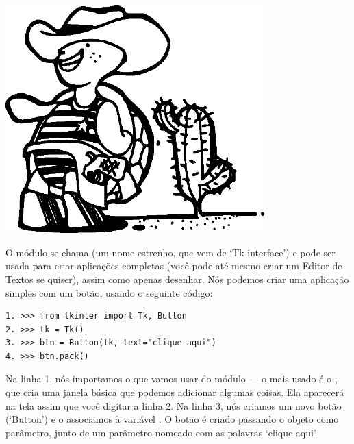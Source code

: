 \begin{center}
\includegraphics*[width=100mm]{eps/turtle2.eps}
\end{center}

O módulo se chama  (um nome estrenho, que vem de `Tk interface') e pode ser usada para criar aplicações completas (você pode até mesmo criar um Editor de Textos se quiser), assim como apenas desenhar. Nós podemos criar uma aplicação simples com um botão, usando o seguinte código:

\begin{listing}
\begin{verbatim}
1. >>> from tkinter import Tk, Button
2. >>> tk = Tk()
3. >>> btn = Button(tk, text="clique aqui")
4. >>> btn.pack()
\end{verbatim}
\end{listing}

Na linha 1, nós importamos o que vamos usar do módulo  --- o mais usado é o , que cria uma janela básica que podemos adicionar algumas coisas. Ela aparecerá na tela assim que você digitar a linha 2. Na linha 3, nós criamos um novo botão (`Button') e o associamos à variável . O botão é criado passando o objeto  como parâmetro, junto de um parâmetro nomeado com as palavras `clique aqui'.

